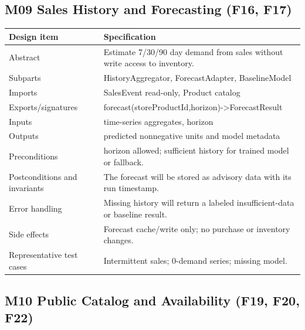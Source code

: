 \subsection{M09 Sales History and Forecasting (F16, F17)}\label{m09-sales-history-and-forecasting-f16-f17}

{\def\LTcaptype{none} %
\begin{longtable}[]{|
  >{\raggedright\arraybackslash}m{}|
  >{\raggedright\arraybackslash}m{}|}
\hline
\begin{minipage}[c]{\linewidth}\raggedright
\textbf{Design item}
\end{minipage} & \begin{minipage}[c]{\linewidth}\raggedright
\textbf{Specification}
\end{minipage} \\
\hline
\endhead

\endlastfoot
Abstract & Estimate 7/30/90 day demand from sales without write access to inventory. \\ \hline
Subparts & HistoryAggregator, ForecastAdapter, BaselineModel \\ \hline
Imports & SalesEvent read-only, Product catalog \\ \hline
Exports/signatures & forecast(storeProductId,horizon)-\textgreater ForecastResult \\ \hline
Inputs & time-series aggregates, horizon \\ \hline
Outputs & predicted nonnegative units and model metadata \\ \hline
Preconditions & horizon allowed; sufficient history for trained model or fallback. \\ \hline
Postconditions and invariants & The forecast will be stored as advisory data with its run timestamp. \\ \hline
Error handling & Missing history will return a labeled insufficient-data or baseline result. \\ \hline
Side effects & Forecast cache/write only; no purchase or inventory changes. \\ \hline
Representative test cases & Intermittent sales; 0-demand series; missing model. \\ \hline
\end{longtable}
}

\subsection{M10 Public Catalog and Availability (F19, F20, F22)}\label{m10-public-catalog-and-availability-f19-f20-f22}

